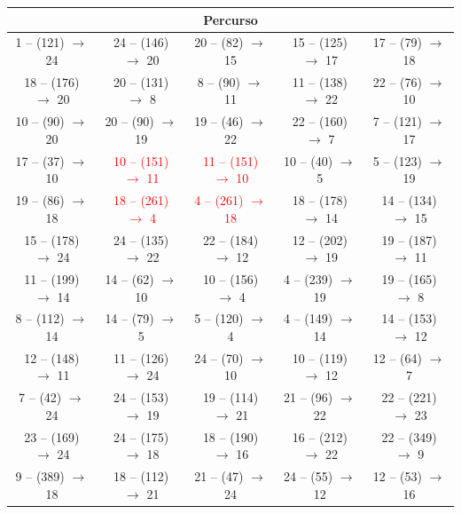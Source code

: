 \begin{table}[H]
    \centering
    \scriptsize
    \begin{tabular}{|c|c|c|c|c|}
        \hline
        \multicolumn{5}{|c|}{Percurso} \\ \hline
    1 -- (121) $\rightarrow$ 24 & 24 -- (146) $\rightarrow$ 20 & 20 -- (82) $\rightarrow$ 15 & 15 -- (125) $\rightarrow$ 17 & 17 -- (79) $\rightarrow$ 18 \\
    18 -- (176) $\rightarrow$ 20 & 20 -- (131) $\rightarrow$ 8 & 8 -- (90) $\rightarrow$ 11 & 11 -- (138) $\rightarrow$ 22 & 22 -- (76) $\rightarrow$ 10 \\
    10 -- (90) $\rightarrow$ 20 & 20 -- (90) $\rightarrow$ 19 & 19 -- (46) $\rightarrow$ 22 & 22 -- (160) $\rightarrow$ 7 & 7 -- (121) $\rightarrow$ 17 \\
    17 -- (37) $\rightarrow$ 10 & \textcolor{red}{10 -- (151) $\rightarrow$ 11} & \textcolor{red}{11 -- (151) $\rightarrow$ 10} & 10 -- (40) $\rightarrow$ 5 & 5 -- (123) $\rightarrow$ 19 \\
    19 -- (86) $\rightarrow$ 18 & \textcolor{red}{18 -- (261) $\rightarrow$ 4} & \textcolor{red}{4 -- (261) $\rightarrow$ 18} & 18 -- (178) $\rightarrow$ 14 & 14 -- (134) $\rightarrow$ 15 \\
    15 -- (178) $\rightarrow$ 24 & 24 -- (135) $\rightarrow$ 22 & 22 -- (184) $\rightarrow$ 12 & 12 -- (202) $\rightarrow$ 19 & 19 -- (187) $\rightarrow$ 11 \\
    11 -- (199) $\rightarrow$ 14 & 14 -- (62) $\rightarrow$ 10 & 10 -- (156) $\rightarrow$ 4 & 4 -- (239) $\rightarrow$ 19 & 19 -- (165) $\rightarrow$ 8 \\
    8 -- (112) $\rightarrow$ 14 & 14 -- (79) $\rightarrow$ 5 & 5 -- (120) $\rightarrow$ 4 & 4 -- (149) $\rightarrow$ 14 & 14 -- (153) $\rightarrow$ 12 \\
    12 -- (148) $\rightarrow$ 11 & 11 -- (126) $\rightarrow$ 24 & 24 -- (70) $\rightarrow$ 10 & 10 -- (119) $\rightarrow$ 12 & 12 -- (64) $\rightarrow$ 7 \\
    7 -- (42) $\rightarrow$ 24 & 24 -- (153) $\rightarrow$ 19 & 19 -- (114) $\rightarrow$ 21 & 21 -- (96) $\rightarrow$ 22 & 22 -- (221) $\rightarrow$ 23 \\
    23 -- (169) $\rightarrow$ 24 & 24 -- (175) $\rightarrow$ 18 & 18 -- (190) $\rightarrow$ 16 & 16 -- (212) $\rightarrow$ 22 & 22 -- (349) $\rightarrow$ 9 \\
    9 -- (389) $\rightarrow$ 18 & 18 -- (112) $\rightarrow$ 21 & 21 -- (47) $\rightarrow$ 24 & 24 -- (55) $\rightarrow$ 12 & 12 -- (53) $\rightarrow$ 16 \\

\end{tabular}
\end{table}
